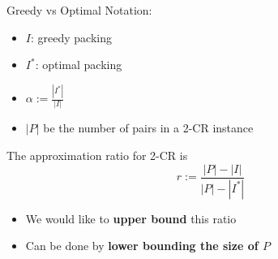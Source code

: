 \begin{frame}{Greedy vs Optimal}
Notation:
\begin{itemize}
\boldmath	
\pause\item
$I$: greedy packing

\pause\item
$I^*$: optimal packing

\pause\item
$\alpha := \frac{|I^*|}{|I|}$ 

\pause\item
$|P|$ be the number of pairs in a 2-CR instance

\end{itemize}

\pause
\begin{observation}
The approximation ratio for 2-CR is
$$ r := \frac{|P| - |I|}{|P| - |I^*|} $$
\end{observation}

\begin{itemize}
\pause\item
We would like to \textbf{upper bound} this ratio
\pause\item
Can be done by \textbf{lower bounding the size of $P$}
\end{itemize}


\end{frame}